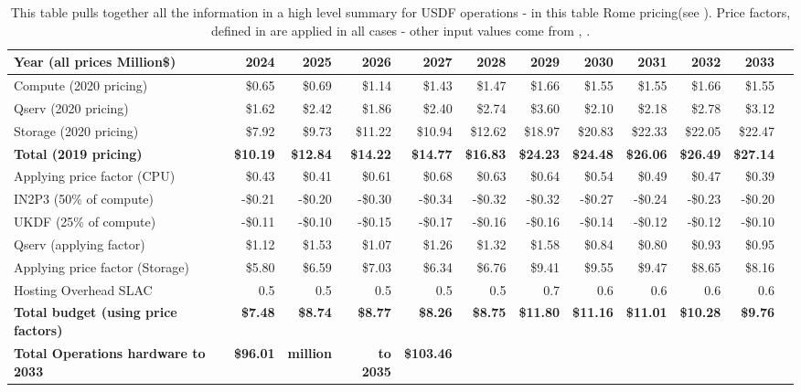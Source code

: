 \tiny \begin{longtable} { |p{}  |r  |r  |r  |r  |r  |r  |r  |r  |r  |r  |r |} 
\caption{This table pulls together all the information in a high level summary for USDF operations - in this table Rome pricing(see ). Price factors, defined in  are applied in all cases - other input values come from , .
 \label{tab:opsSumUSDF}}\\ 
\hline 
\textbf{Year  (all prices Million\$)}&\textbf{2024}&\textbf{2025}&\textbf{2026}&\textbf{2027}&\textbf{2028}&\textbf{2029}&\textbf{2030}&\textbf{2031}&\textbf{2032}&\textbf{2033} \\ \hline
{Compute (2020 pricing)}&{\$0.65}&{\$0.69}&{\$1.14}&{\$1.43}&{\$1.47}&{\$1.66}&{\$1.55}&{\$1.55}&{\$1.66}&{\$1.55} \\ \hline
{Qserv (2020 pricing)}&{\$1.62}&{\$2.42}&{\$1.86}&{\$2.40}&{\$2.74}&{\$3.60}&{\$2.10}&{\$2.18}&{\$2.78}&{\$3.12} \\ \hline
{Storage (2020 pricing)}&{\$7.92}&{\$9.73}&{\$11.22}&{\$10.94}&{\$12.62}&{\$18.97}&{\$20.83}&{\$22.33}&{\$22.05}&{\$22.47} \\ \hline
\textbf{Total (2019 pricing)}&\textbf{\$10.19}&\textbf{\$12.84}&\textbf{\$14.22}&\textbf{\$14.77}&\textbf{\$16.83}&\textbf{\$24.23}&\textbf{\$24.48}&\textbf{\$26.06}&\textbf{\$26.49}&\textbf{\$27.14} \\ \hline
{Applying price factor (CPU)}&{\$0.43}&{\$0.41}&{\$0.61}&{\$0.68}&{\$0.63}&{\$0.64}&{\$0.54}&{\$0.49}&{\$0.47}&{\$0.39} \\ \hline
{IN2P3 (50\% of compute)}&{-\$0.21}&{-\$0.20}&{-\$0.30}&{-\$0.34}&{-\$0.32}&{-\$0.32}&{-\$0.27}&{-\$0.24}&{-\$0.23}&{-\$0.20} \\ \hline
{UKDF (25\% of compute)}&{-\$0.11}&{-\$0.10}&{-\$0.15}&{-\$0.17}&{-\$0.16}&{-\$0.16}&{-\$0.14}&{-\$0.12}&{-\$0.12}&{-\$0.10} \\ \hline
{Qserv (applying factor)}&{\$1.12}&{\$1.53}&{\$1.07}&{\$1.26}&{\$1.32}&{\$1.58}&{\$0.84}&{\$0.80}&{\$0.93}&{\$0.95} \\ \hline
{Applying price factor (Storage)}&{\$5.80}&{\$6.59}&{\$7.03}&{\$6.34}&{\$6.76}&{\$9.41}&{\$9.55}&{\$9.47}&{\$8.65}&{\$8.16} \\ \hline
{Hosting Overhead SLAC
}&{0.5}&{0.5}&{0.5}&{0.5}&{0.5}&{0.7}&{0.6}&{0.6}&{0.6}&{0.6} \\ \hline
\textbf{Total budget (using price factors)}&\textbf{\$7.48}&\textbf{\$8.74}&\textbf{\$8.77}&\textbf{\$8.26}&\textbf{\$8.75}&\textbf{\$11.80}&\textbf{\$11.16}&\textbf{\$11.01}&\textbf{\$10.28}&\textbf{\$9.76} \\ \hline
\textbf{Total Operations hardware to 2033}&\textbf{\$96.01}&\textbf{million}&\textbf{to 2035}&\textbf{\$103.46}&&&&&& \\ \hline
\end{longtable} \normalsize
